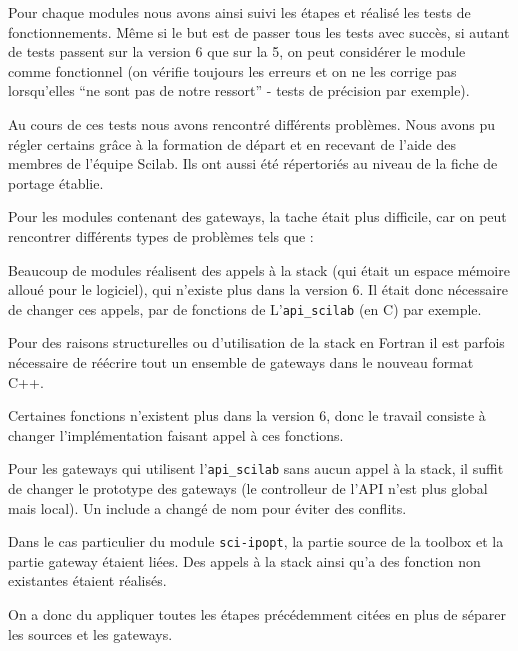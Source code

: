 Pour chaque modules nous avons ainsi suivi les étapes et réalisé
les tests de fonctionnements. Même si le but est de passer tous
les tests avec succès, si autant de tests passent sur la version
6 que sur la 5, on peut considérer le module comme fonctionnel
(on vérifie toujours les erreurs et on ne les corrige pas
lorsqu’elles “ne sont pas de notre ressort” - tests de précision
par exemple).

Au cours de ces tests nous avons rencontré différents problèmes.
Nous avons pu régler certains grâce à la formation de départ
et en recevant de l’aide des membres de l'équipe Scilab.
Ils ont aussi été répertoriés au niveau de la fiche de portage établie.

Pour les modules contenant des gateways, la tache était plus difficile,
car on peut rencontrer différents types de problèmes tels que :

Beaucoup de modules réalisent des appels à la stack
(qui était un espace mémoire alloué pour le logiciel),
qui n’existe plus dans la version 6.
Il était donc nécessaire de changer ces appels,
par de fonctions de L’{\tt api\_scilab} (en C) par exemple.

Pour des raisons structurelles ou d’utilisation de la stack
en Fortran il est parfois nécessaire de réécrire tout un ensemble
de gateways dans le nouveau format C++.

Certaines fonctions n’existent plus dans la version 6,
donc le travail consiste à changer l’implémentation
faisant appel à ces fonctions.

Pour les gateways qui utilisent l’{\tt api\_scilab} sans aucun appel
à la stack, il suffit de changer le prototype des gateways
(le controlleur de l’API n’est plus global mais local).
Un include a chang\'e de nom pour éviter des conflits.

Dans le cas particulier du module {\tt sci-ipopt},
la partie source de la toolbox et la partie gateway étaient liées.
Des appels à la stack ainsi qu’a des fonction non
existantes étaient réalisés.

On a donc du appliquer toutes les étapes précédemment citées
en plus de séparer les sources et les gateways.

